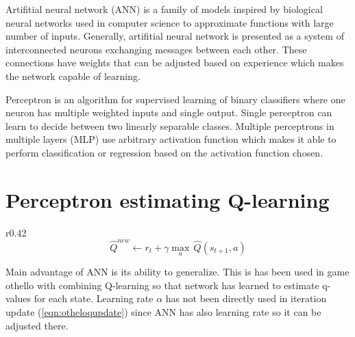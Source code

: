 Artifitial neural network (ANN) is a family of models inspired by biological
neural networks used in computer science to approximate functions with
large number of inputs. Generally, artifitial neural network is presented
as a system of interconnected neurons exchanging messages between each
other. These connections have weights that can be adjusted based on
experience which makes the network capable of learning.

Perceptron is an algorithm for supervised learning of binary classifiers
where one neuron has multiple weighted inputs and single output. Single
perceptron can learn to decide between two linearly separable
classes. Multiple perceptrons in multiple layers (MLP) use arbitrary
activation function which makes it able to perform classification or
regression based on the activation function chosen.

\section{Perceptron estimating Q-learning}
\begin{wrapfigure}{r}{0.42\textwidth}
  \vspace*{-1.15cm}
  \begin{equation}
    \label{eqn:otheloqupdate}
    \hat{Q}^{new}\!\leftarrow\!r_t\!+\!{\gamma}{\max_a}\,\hat{Q}(s_{t+1},\!a)
  \end{equation}
  \vspace*{-0.95cm}
\end{wrapfigure}

Main advantage of ANN is its ability to generalize. This is has been used
in game othello \cite{othello} with combining Q-learning so that network
has learned to estimate q-values for each state. Learning rate $\alpha$ has
not been directly used in iteration update (\ref{eqn:otheloqupdate}) since
ANN has also learning rate so it can be adjusted there.

